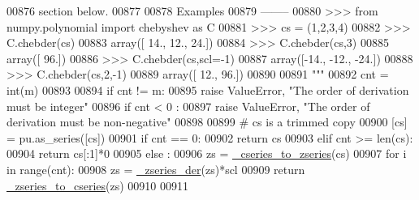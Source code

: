 \begin{DoxyCode}
00876 \textcolor{stringliteral}{    section below.}
00877 \textcolor{stringliteral}{}
00878 \textcolor{stringliteral}{    Examples}
00879 \textcolor{stringliteral}{    --------}
00880 \textcolor{stringliteral}{    >>> from numpy.polynomial import chebyshev as C}
00881 \textcolor{stringliteral}{    >>> cs = (1,2,3,4)}
00882 \textcolor{stringliteral}{    >>> C.chebder(cs)}
00883 \textcolor{stringliteral}{    array([ 14.,  12.,  24.])}
00884 \textcolor{stringliteral}{    >>> C.chebder(cs,3)}
00885 \textcolor{stringliteral}{    array([ 96.])}
00886 \textcolor{stringliteral}{    >>> C.chebder(cs,scl=-1)}
00887 \textcolor{stringliteral}{    array([-14., -12., -24.])}
00888 \textcolor{stringliteral}{    >>> C.chebder(cs,2,-1)}
00889 \textcolor{stringliteral}{    array([ 12.,  96.])}
00890 \textcolor{stringliteral}{}
00891 \textcolor{stringliteral}{    """}
00892     cnt = int(m)
00893 
00894     \textcolor{keywordflow}{if} cnt != m:
00895         \textcolor{keywordflow}{raise} ValueError, \textcolor{stringliteral}{"The order of derivation must be integer"}
00896     \textcolor{keywordflow}{if} cnt < 0 :
00897         \textcolor{keywordflow}{raise} ValueError, \textcolor{stringliteral}{"The order of derivation must be non-negative"}
00898 
00899     \textcolor{comment}{# cs is a trimmed copy}
00900     [cs] = pu.as\_series([cs])
00901     \textcolor{keywordflow}{if} cnt == 0:
00902         \textcolor{keywordflow}{return} cs
00903     \textcolor{keywordflow}{elif} cnt >= len(cs):
00904         \textcolor{keywordflow}{return} cs[:1]*0
00905     \textcolor{keywordflow}{else} :
00906         zs = \hyperlink{namespacepyneb_1_1utils_1_1chebyshev_a659e346f7cdd9fd058850b26f7e95b17}{\_cseries\_to\_zseries}(cs)
00907         \textcolor{keywordflow}{for} i \textcolor{keywordflow}{in} range(cnt):
00908             zs = \hyperlink{namespacepyneb_1_1utils_1_1chebyshev_adb39b6e9d3aba3bf3784a3364ec3e6ca}{\_zseries\_der}(zs)*scl
00909         \textcolor{keywordflow}{return} \hyperlink{namespacepyneb_1_1utils_1_1chebyshev_a2a88474ce0ea12fb26f82b7116752dc1}{\_zseries\_to\_cseries}(zs)
00910 
00911 
\end{DoxyCode}
\hypertarget{namespacepyneb_1_1utils_1_1chebyshev_aa84df28815f29342a7cdce9b95470f02}{}
